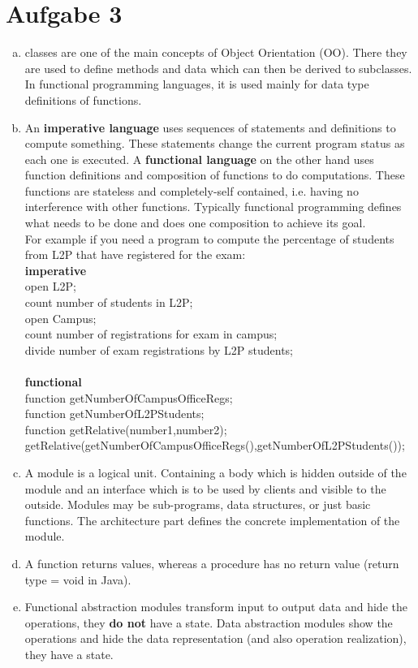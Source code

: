 \documentclass[a4paper,10pt]{scrartcl}[2003/01/01]
\begin{document}
	\section{Aufgabe 3}
	\begin{enumerate}[a)]
		\item classes are one of the main concepts of Object Orientation (OO). There they are used to define methods and data which can then be derived to subclasses. In functional programming languages, it is used mainly for data type definitions of functions.
		\item An \textbf{imperative language} uses sequences of statements and definitions to compute something. These statements change the current program status as each one is executed. A \textbf{functional language} on the other hand uses function definitions and composition of functions to do computations. These functions are stateless and completely-self contained, i.e. having no interference with other functions. Typically functional programming defines what needs to be done and does one composition to achieve its goal.\\For example if you need a program to compute the percentage of students from L2P that have registered for the exam:\\
		\textbf{imperative}\\
		open L2P;\\
		count number of students in L2P;\\
		open Campus;\\
		count number of registrations for exam in campus;\\
		divide number of exam registrations by L2P students;\\~\\
		\textbf{functional}\\
		function getNumberOfCampusOfficeRegs;\\
		function getNumberOfL2PStudents;\\
		function getRelative(number1,number2);\\
		getRelative(getNumberOfCampusOfficeRegs(),getNumberOfL2PStudents());
		\item A module is a logical unit. Containing a body which is hidden outside of the module and an interface which is to be used by clients and visible to the outside. Modules may be sub-programs, data structures, or just basic functions. The architecture part defines the concrete implementation of the module.
		\item A function returns values, whereas a procedure has no return value (return type = void in Java).
		\item Functional abstraction modules transform input to output data and hide the operations, they \textbf{do not} have a state. Data abstraction modules show the operations and hide the data representation (and also operation realization), they have a state.
	\end{enumerate}
	
\end{document}
